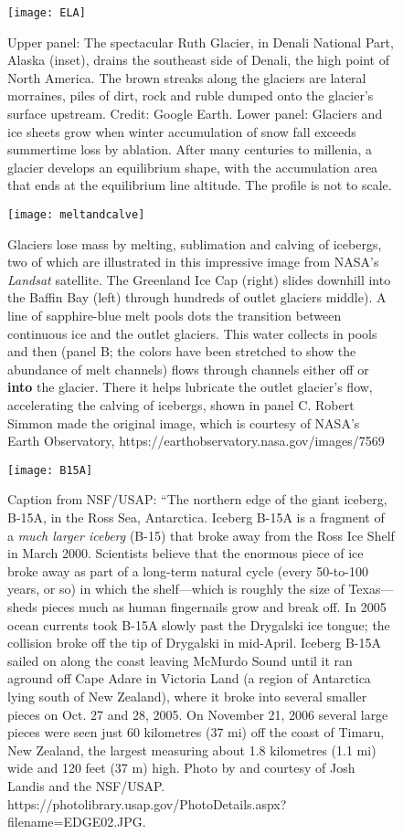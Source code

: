 \documentclass[amstex,12pt]{book}
\begin{document}
\begin{figure}[p]
	\centering
  \texttt{[image: ELA]}%
	\caption{Upper panel: The spectacular Ruth Glacier, in Denali National Part, Alaska (inset), drains the southeast side of Denali, the high point of North America. The brown streaks along the glaciers are lateral morraines, piles of dirt, rock and ruble dumped onto the glacier's surface upstream. Credit: Google Earth. Lower panel: Glaciers and ice sheets grow when winter accumulation of snow fall exceeds summertime loss by ablation. After many centuries to millenia, a glacier develops an equilibrium shape, with the accumulation area that ends at the equilibrium line altitude. The profile is not to scale.  }
	\label{fig:ELA}
\end{figure}

\begin{figure}[p]
	\centering
  \texttt{[image: meltandcalve]}%
	\caption{Glaciers lose mass by melting, sublimation and calving of icebergs, two of which are illustrated in this impressive image from NASA's \textit{Landsat} satellite. The Greenland Ice Cap (right) slides downhill into the Baffin Bay (left) through hundreds of outlet glaciers middle). A line of sapphire-blue melt pools dots the transition between continuous ice and the outlet glaciers. This water collects in pools and then (panel B; the colors have been stretched to show the abundance of melt channels) flows through channels either off or \textbf{into} the glacier. There it helps lubricate the outlet glacier's flow, accelerating the calving of icebergs, shown in panel C. Robert Simmon made the original image, which is courtesy of NASA's Earth Observatory, https://earthobservatory.nasa.gov/images/7569  }
	\label{fig:glacial_loss}
\end{figure}

\begin{figure}[p]
	\centering
  \texttt{[image: B15A]}%
	\caption{Caption from NSF/USAP: ``The northern edge of the giant iceberg, B-15A, in the Ross Sea, Antarctica. Iceberg B-15A is a fragment of a \emph{much larger iceberg} (B-15) that broke away from the Ross Ice Shelf in March 2000. Scientists believe that the enormous piece of ice broke away as part of a long-term natural cycle (every 50-to-100 years, or so) in which the shelf---which is roughly the size of Texas---sheds pieces much as human fingernails grow and break off. In 2005 ocean currents took B-15A slowly past the Drygalski ice tongue; the collision broke off the tip of Drygalski in mid-April. Iceberg B-15A sailed on along the coast leaving McMurdo Sound until it ran aground off Cape Adare in Victoria Land (a region of Antarctica lying south of New Zealand), where it broke into several smaller pieces on Oct. 27 and 28, 2005. On November 21, 2006 several large pieces were seen just 60 kilometres (37 mi) off the coast of Timaru, New Zealand, the largest measuring about 1.8 kilometres (1.1 mi) wide and 120 feet (37 m) high. Photo by and courtesy of Josh Landis and the NSF/USAP. https://photolibrary.usap.gov/PhotoDetails.aspx?filename=EDGE02.JPG.}  
	\label{fig:B15}
\end{figure}
\end{document}
